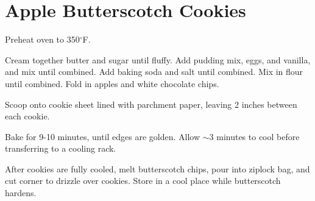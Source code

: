 \section{Apple Butterscotch Cookies}
\begin{recipe}



	Preheat oven to 350$^{\circ}$F.

	Cream together butter and sugar until fluffy. Add pudding mix, eggs, and vanilla, and mix until combined. Add baking soda and salt until combined. Mix in flour until combined. Fold in apples and white chocolate chips.

	Scoop onto cookie sheet lined with parchment paper, leaving 2 inches between each cookie.

	Bake for 9-10 minutes, until edges are golden. Allow $\sim$3 minutes to cool before transferring to a cooling rack.

	After cookies are fully cooled, melt butterscotch chips, pour into ziplock bag, and cut corner to drizzle over cookies. Store in a cool place while butterscotch hardens.


\end{recipe}
